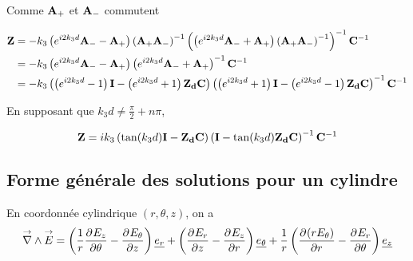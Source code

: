Comme $\mA_+$ et $\mA_-$ commutent

\begin{align}
    \mat{Z} &=-k_3\left( e^{i2 k_3 d} \mA_- -  \mA_+\right)\left(\mA_+\mA_-\right)^{-1}
    \left(\left( e^{i2 k_3 d} \mA_- + \mA_+ \right)\left(\mA_+\mA_-\right)^{-1}\right)^{-1}\mC^{-1}
    \\
    &= -k_3\left( e^{i2 k_3 d} \mA_- -  \mA_+\right)
    \left( e^{i2 k_3 d} \mA_- + \mA_+ \right)^{-1}\mC^{-1}
    \\
    &= -k_3\left(\left( e^{i2 k_3 d} - 1 \right)\mI - \left( e^{i2 k_3 d} + 1 \right) \mat{Z_d}\mC \right)
    \left( \left( e^{i2 k_3 d} + 1 \right)\mI - \left( e^{i2 k_3 d} - 1 \right)\mat{Z_d}\mC \right)^{-1}\mC^{-1}   
\end{align}

En supposant que $k_3d\not = \frac{\pi}{2}+n\pi$, 

\begin{equation}
\mZ = ik_3\left(\tan(k_3 d)\mI - \mat{Z_d}\mC \right)
    \left( \mI - \tan(k_3 d)\mat{Z_d}\mC \right)^{-1}\mC^{-1} 
\end{equation}









\subsection{Forme générale des solutions pour un cylindre}

\newcommand{\mr}{r}
\newcommand{\mt}{\theta}
\newcommand{\mz}{z}

\begin{figure}[!htb]
    \centering
    \begin{tikzpicture}
        
    \end{tikzpicture}
\end{figure}



En coordonnée cylindrique $(r,\theta,z)$, on a
\begin{equation}
    \vrot \vE = \left(\frac{1}{r}\ddr{\theta}{E_z} - \ddr{z}{E_\theta}\right)\v{e_r} + 
    \left(\ddr{z}{E_r} - \ddr{r}{E_z}\right)\v{e_\theta} +
    \frac{1}{r}\left(\ddr{r}{(rE_\theta)}-\ddr{\theta}{E_r}\right)\v{e_z}
\end{equation}

